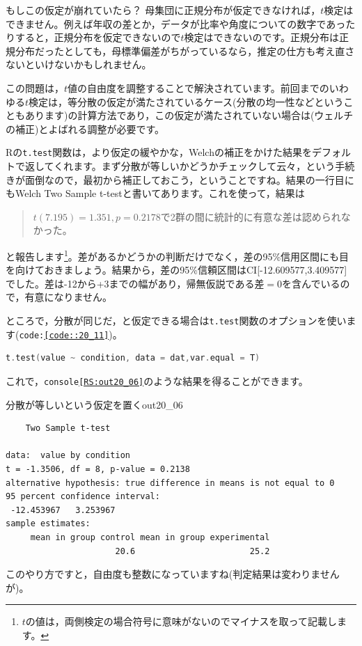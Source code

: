 \documentclass{ltjsbook}
\begin{document}
もしこの仮定が崩れていたら？ 母集団に正規分布が仮定できなければ，$t$検定はできません。例えば年収の差とか，データが比率や角度についての数字であったりすると，正規分布を仮定できないので$t$検定はできないのです。正規分布は正規分布だったとしても，母標準偏差がちがっているなら，推定の仕方も考え直さないといけないかもしれません。

この問題は，$t$値の自由度を調整することで解決されています。前回までのいわゆる$t$検定は，等分散の仮定が満たされているケース(分散の均一性などということもあります)の計算方法であり，この仮定が満たされていない場合は(ウェルチの補正)とよばれる調整が必要です。

Rの\texttt{t.test}関数は，より仮定の緩やかな，Welchの補正をかけた結果をデフォルトで返してくれます。まず分散が等しいかどうかチェックして云々，という手続きが面倒なので，最初から補正しておこう，ということですね。結果の一行目にもWelch Two Sample t-testと書いてあります。これを使って，結果は
\begin{quote}
    $t(7.195)=1.351,p = 0.2178$で2群の間に統計的に有意な差は認められなかった。
\end{quote}
と報告します\footnote{$t$の値は，両側検定の場合符号に意味がないのでマイナスを取って記載します。}。差があるかどうかの判断だけでなく，差の95\%信用区間にも目を向けておきましょう。結果から，差の95\%信頼区間はCI[-12.609577,3.409577]でした。差は-12から+3までの幅があり，帰無仮説である差$=0$を含んでいるので，有意になりません。


ところで，分散が同じだ，と仮定できる場合は\texttt{t.test}関数のオプションを使います(\texttt{code:\ref{code::20_11}})。

\begin{lstlisting}[language=c++,label={code::20_11},caption={分散のオプション指定}]
t.test(value ~ condition, data = dat,var.equal = T)
\end{lstlisting}

これで，\texttt{console\ref{RS:out20_06}}のような結果を得ることができます。

\begin{Rscreen}{分散が等しいという仮定を置く}{out20_06}
\begin{verbatim}
	Two Sample t-test

data:  value by condition
t = -1.3506, df = 8, p-value = 0.2138
alternative hypothesis: true difference in means is not equal to 0
95 percent confidence interval:
 -12.453967   3.253967
sample estimates:
     mean in group control mean in group experimental 
                      20.6                       25.2 
\end{verbatim}
\end{Rscreen}
このやり方ですと，自由度も整数になっていますね(判定結果は変わりませんが)。
\end{document}
